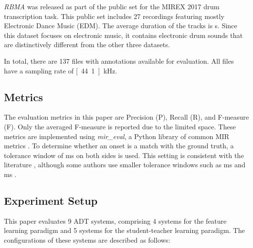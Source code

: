 \documentclass{article}
\begin{document}
\textit{RBMA} was released as part of the public set for the MIREX 2017 drum transcription task. This public set includes 27 recordings featuring mostly Electronic Dance Music (EDM). The average duration of the tracks is \unit[230]{s}. Since this dataset focuses on electronic music, it contains electronic drum sounds that are distinctively different from the other three datasets. 

In total, there are 137 files with annotations available for evaluation. All files have a sampling rate of  \unit[44.1]{kHz}.

\subsection{Metrics}
The evaluation metrics in this paper are Precision (P), Recall (R), and F-measure (F). Only the averaged F-measure is reported due to the limited space. These metrics are implemented using \textit{mir\_eval}, a Python library of common MIR metrics \cite{Raffel2014}. 
To determine whether an onset is a match with the ground truth, a tolerance window of \unit[50]{ms} on both sides is used. This setting is consistent with the literature \cite{Gillet2008_taslp, Wu2015_ismir, Southall2016}, although some authors use smaller tolerance windows such as \unit[30]{ms} \cite{PaulusK09_DrumTransHMM_JASMP} and \unit[20]{ms} \cite{Vogl2017_icassp}.

\subsection{Experiment Setup}
This paper evaluates 9 ADT systems, comprising 4 systems for the feature learning paradigm and 5 systems for the student-teacher learning paradigm. The configurations of these systems are described as follows:
\end{document}
